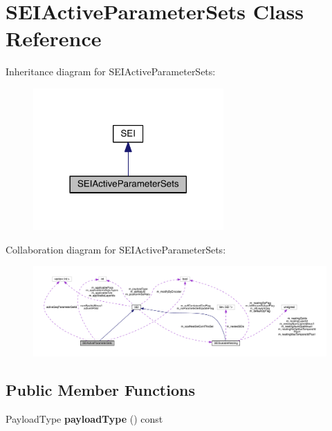 \hypertarget{class_s_e_i_active_parameter_sets}{}\section{S\+E\+I\+Active\+Parameter\+Sets Class Reference}
\label{class_s_e_i_active_parameter_sets}


Inheritance diagram for S\+E\+I\+Active\+Parameter\+Sets\+:
\nopagebreak
\begin{figure}[H]
\begin{center}
\leavevmode
\includegraphics[width=206pt]{dc/def/class_s_e_i_active_parameter_sets__inherit__graph}
\end{center}
\end{figure}


Collaboration diagram for S\+E\+I\+Active\+Parameter\+Sets\+:
\nopagebreak
\begin{figure}[H]
\begin{center}
\leavevmode
\includegraphics[width=350pt]{d5/d56/class_s_e_i_active_parameter_sets__coll__graph}
\end{center}
\end{figure}
\subsection*{Public Member Functions}
\begin{DoxyCompactItemize}
\item 
\mbox{\label{class_s_e_i_active_parameter_sets_aa2cab22037514711dff5dba4ddeaaa65}} 
Payload\+Type {\bfseries payload\+Type} () const
\end{DoxyCompactItemize}
